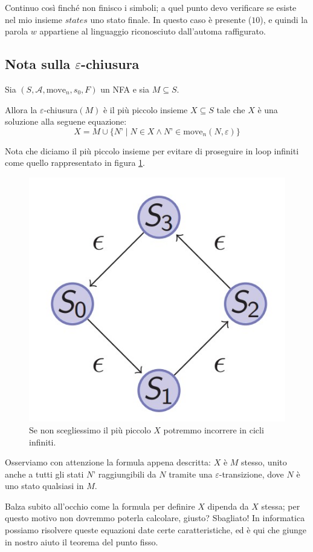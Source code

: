 \documentclass[class=book, crop=false, oneside, 12pt]{standalone}
\begin{document}
Continuo così finché non finisco i simboli; a quel punto devo verificare se esiste nel mio insieme \(states\) uno stato finale. In questo caso è presente (\(10\)), e quindi la parola \(w\) appartiene al linguaggio riconosciuto dall’automa raffigurato.


\subsection{Nota sulla \(\varepsilon\)-chiusura}
\begin{theorem}
    Sia \((S, \mathcal{A}, \textrm{move}_n, s_0, F)\) un NFA e sia \(M \subseteq S\).
    
    Allora la \(\varepsilon\)-chiusura\((M)\) è il più piccolo insieme \(X \subseteq S\) tale che \(X\) è una soluzione alla seguene equazione:
    \begin{equation}
        X = M \cup \{ N’ \mid N \in X \land N’ \in \textrm{move}_n (N,\varepsilon)\}
        \label{eps-closure-set-eq}
    \end{equation}
\end{theorem}

\noindent Nota che diciamo il più piccolo insieme per evitare di proseguire in loop infiniti come quello rappresentato in figura \ref{nfa_ciclico}.

\begin{figure}
    \centering
    \includegraphics[width=.3\textwidth,keepaspectratio]{nfa_ciclico}
    \caption{Se non scegliessimo il più piccolo \(X\) potremmo incorrere in cicli infiniti.}
    \label{nfa_ciclico}
\end{figure}

Osserviamo con attenzione la formula appena descritta: \(X\) è \(M\) stesso, unito anche a tutti gli stati \(N’\) raggiungibili da \(N\) tramite una \(\varepsilon\)-transizione, dove \(N\) è uno stato qualsiasi in \(M\).

Balza subito all'occhio come la formula per definire \(X\) dipenda da \(X\) stessa; per questo motivo non dovremmo poterla calcolare, giusto? 
Sbagliato! In informatica possiamo risolvere queste equazioni date certe caratteristiche, ed è qui che giunge in nostro aiuto il teorema del punto fisso. 
\end{document}
